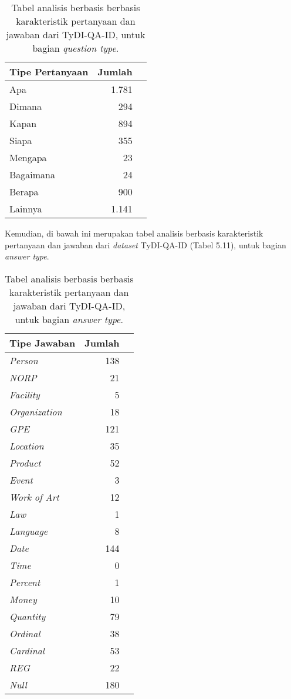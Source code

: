 \begin{table}[H]\centering
\begin{tabular}{lrr}\toprule
Tipe Pertanyaan &Jumlah \\\midrule
Apa &1.781 \\
Dimana &294 \\
Kapan &894 \\
Siapa &355 \\
Mengapa &23 \\
Bagaimana &24 \\
Berapa &900 \\
Lainnya &1.141 \\
\bottomrule
\end{tabular}
\caption{Tabel analisis berbasis berbasis karakteristik pertanyaan dan jawaban dari TyDI-QA-ID, untuk bagian \emph{question type}.}
\end{table}

Kemudian, di bawah ini merupakan tabel analisis berbasis karakteristik pertanyaan dan jawaban dari \emph{dataset} TyDI-QA-ID (Tabel 5.11), untuk bagian \emph{answer type}.

\begin{table}[H]\centering
\begin{tabular}{lrr}\toprule
Tipe Jawaban &Jumlah \\\midrule
\emph{Person} &  138\\
\emph{NORP} &  21\\
\emph{Facility} &  5\\
\emph{Organization} &  18\\
\emph{GPE} &  121\\
\emph{Location} & 35\\
\emph{Product} &  52\\
\emph{Event} &  3\\

\emph{Work of Art} &  12\\
\emph{Law} &  1\\
\emph{Language} &  8\\
\emph{Date} &  144\\
\emph{Time} &  0\\
\emph{Percent} & 1\\
\emph{Money} &  10\\
\emph{Quantity} &  79\\

\emph{Ordinal} &  38\\
\emph{Cardinal} &  53\\
\emph{REG} &  22\\
\emph{Null} &  180\\
\bottomrule
\end{tabular}
\caption{Tabel analisis berbasis berbasis karakteristik pertanyaan dan jawaban dari TyDI-QA-ID, untuk bagian \emph{answer type}.}
\end{table}


